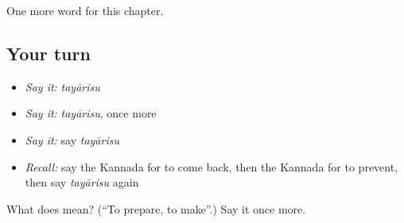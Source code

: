 \begin{grammarlens}[title={What you've built}]
One more word for this chapter.
\end{grammarlens}

\subsection*{Your turn}
\begin{itemize}
\raggedright
  \item \emph{Say it:} \emph{tayārisu}
  \item \emph{Say it:} \emph{tayārisu}, once more
  \item \emph{Say it:} say \emph{tayārisu}
  \item \emph{Recall:} say the Kannada for to come back, then the Kannada for to prevent, then say \emph{tayārisu} again
\end{itemize}

\begin{tcolorbox}[breakable,colback=teal!4,colframe=teal!35!black,title={Before you move on}]
What does  mean? (\textquotedblleft{}To prepare, to make\textquotedblright{}.) Say it once more.
\end{tcolorbox}
